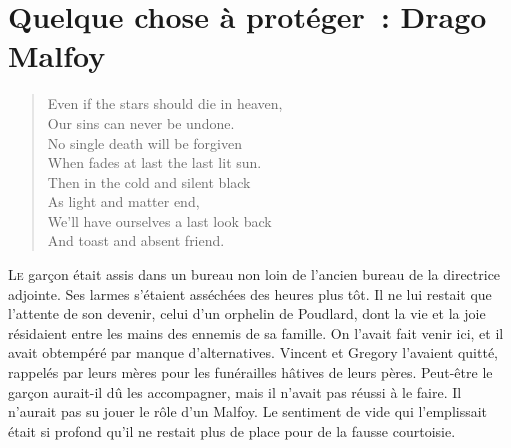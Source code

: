 \chapter[Quelque chose à protéger~: Drago Malfoy]{Quelque chose à protéger~: Drago Malfoy\protect\footnotemark}
    \begin{verse}
      Even if the stars should die in heaven, \\
      Our sins can never be undone. \\
      No single death will be forgiven \\
      When fades at last the last lit sun. \\
      Then in the cold and silent black \\
      As light and matter end, \\
      We’ll have ourselves a last look back \\
      And toast and absent friend. \\
    \end{verse}

\lettrine{L}{e} garçon était assis dans un bureau non loin de l'ancien bureau de la directrice adjointe.
Ses larmes s'étaient asséchées des heures plus tôt.
Il ne lui restait que l'attente de son devenir, celui d'un orphelin de Poudlard, dont la vie et la joie résidaient entre les mains des ennemis de sa famille.
On l'avait fait venir ici, et il avait obtempéré par manque d'alternatives.
Vincent et Gregory l'avaient quitté, rappelés par leurs mères pour les funérailles hâtives de leurs pères.
Peut-être le garçon aurait-il dû les accompagner, mais il n'avait pas réussi à le faire.
Il n'aurait pas su jouer le rôle d'un Malfoy.
Le sentiment de vide qui l'emplissait était si profond qu'il ne restait plus de place pour de la fausse courtoisie.

